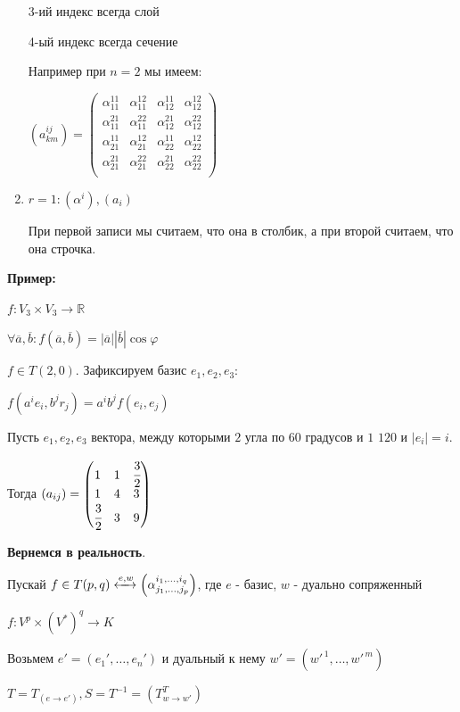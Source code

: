 \begin{enumerate}
3-ий индекс всегда слой

4-ый индекс всегда сечение

Например при $n=2$ мы имеем:

$(a^{ij}_{km}) = \left(
\begin{array}{cc|cc}
  \alpha^{11}_{11} & \alpha^{12}_{11} & \alpha^{11}_{12} & \alpha^{12}_{12} \\
  \alpha^{21}_{11} & \alpha^{22}_{11} & \alpha^{21}_{12} & \alpha^{22}_{12} \\
\hline
  \alpha^{11}_{21} & \alpha^{12}_{21} & \alpha^{11}_{22} & \alpha^{12}_{22} \\
  \alpha^{21}_{21} & \alpha^{22}_{21} & \alpha^{21}_{22} & \alpha^{22}_{22} \\
\end{array}
\right)$


\item $r=1: (\alpha^i), (a_i)$ 

При первой записи мы считаем, что она в столбик, а при второй считаем, что она строчка.

\end{enumerate}


\textbf{Пример:} 

$f:V_3\times V_3 \rightarrow \mathbb{R}$

$\forall \overline{a}, \overline{b}: f(\overline{a},\overline{b}) = |\overline{a}||\overline{b}|\cos \varphi$

$f\in T(2,0)$. Зафиксируем базис $e_1,e_2,e_3$:

$f(a^ie_i,b^jr_j) = a^ib^j f(e_i,e_j)$

Пусть $e_1,e_2,e_3$ вектора, между которыми $2$ угла по $60$ градусов и $1$ $120$  и $|e_i|=i$.

Тогда $(a_{ij})= \begin{pmatrix}
    1 & 1 & \cfrac{3}{2} \\
    1 & 4& 3 \\
    \cfrac{3}{2} & 3 & 9
\end{pmatrix}$


\textbf{Вернемся в реальность}.

Пускай $f \in T(p,q) \xleftrightarrow{e,w} \left(\alpha^{i_1,\ldots,i_q}_{j_1,\ldots,j_p}\right)$, где $e$ - базис, $w$ - дуально сопряженный

$f: V^p \times (V^*)^q\rightarrow K$

Возьмем $e' = (e_1',\ldots,e_n' )$ и дуальный к нему $w'=(w'^{\,1},\ldots, w'^{\,m})$

$T = T_{(e\rightarrow e')}, S = T^{-1} = (T_{w\to w'}^T)$

